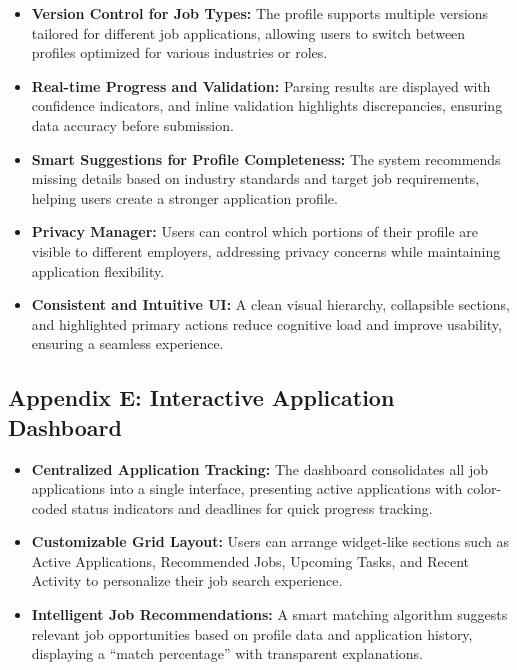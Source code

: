 \documentclass[
	letterpaper, %
]{jdf}
\begin{document}
\begin{sloppypar}
\begin{itemize}
    \item \textbf{Version Control for Job Types:} The profile supports multiple versions tailored for different job applications, allowing users to switch between profiles optimized for various industries or roles.
    
    \item \textbf{Real-time Progress and Validation:} Parsing results are displayed with confidence indicators, and inline validation highlights discrepancies, ensuring data accuracy before submission.
    
    \item \textbf{Smart Suggestions for Profile Completeness:} The system recommends missing details based on industry standards and target job requirements, helping users create a stronger application profile.
    
    \item \textbf{Privacy Manager:} Users can control which portions of their profile are visible to different employers, addressing privacy concerns while maintaining application flexibility.
    
    \item \textbf{Consistent and Intuitive UI:} A clean visual hierarchy, collapsible sections, and highlighted primary actions reduce cognitive load and improve usability, ensuring a seamless experience.
\end{itemize}

\hfill \break
\subsection{Appendix E: Interactive Application Dashboard}
\begin{itemize}
    \item \textbf{Centralized Application Tracking:} The dashboard consolidates all job applications into a single interface, presenting active applications with color-coded status indicators and deadlines for quick progress tracking.
    
    \item \textbf{Customizable Grid Layout:} Users can arrange widget-like sections such as Active Applications, Recommended Jobs, Upcoming Tasks, and Recent Activity to personalize their job search experience.
    
    \item \textbf{Intelligent Job Recommendations:} A smart matching algorithm suggests relevant job opportunities based on profile data and application history, displaying a “match percentage” with transparent explanations.
    

\end{itemize}
\end{sloppypar}
\end{document}
